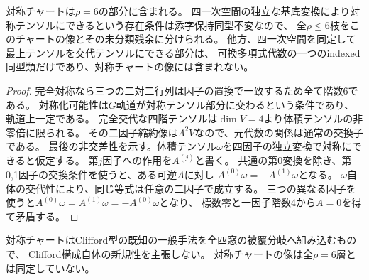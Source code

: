 \begin{corollary}\label{cor:symmetric-rank-six}
対称チャートは$\rho=6$の部分に含まれる。
四一次空間の独立な基底変換により対称テンソルにできるという存在条件は添字保持同型不変なので、
全$\rho\leq6$枝をこのチャートの像とその未分類残余に分けられる。
他方、四一次空間を同定して最上テンソルを交代テンソルにできる部分は、
可換多項式代数の一つのindexed同型類だけであり、対称チャートの像には含まれない。
\end{corollary}
\begin{proof}
完全対称なら三つの二対二行列は因子の置換で一致するため全て階数6である。
対称化可能性は$G$軌道が対称テンソル部分に交わるという条件であり、軌道上一定である。
完全交代な四階テンソルは$\dim V=4$より体積テンソルの非零倍に限られる。
その二因子縮約像は$\Lambda^2 V$なので、元代数の関係は通常の交換子である。
最後の非交差性を示す。体積テンソル$\omega$を四因子の独立変換で対称にできると仮定する。
第$j$因子への作用を$A^{(j)}$と書く。
共通の第0変換を除き、第0,1因子の交換条件を使うと、ある可逆$A$に対し
$A^{(0)}\omega=-A^{(1)}\omega$となる。
$\omega$自体の交代性により、同じ等式は任意の二因子で成立する。
三つの異なる因子を使うと$A^{(0)}\omega=A^{(1)}\omega=-A^{(0)}\omega$となり、
標数零と一因子階数4から$A=0$を得て矛盾する。

\end{proof}
\begin{remark}
対称チャートはClifford型の既知の一般手法を全四窓の被覆分岐へ組み込むもので、
Clifford構成自体の新規性を主張しない。
対称チャートの像は全$\rho=6$層とは同定していない。
\end{remark}

